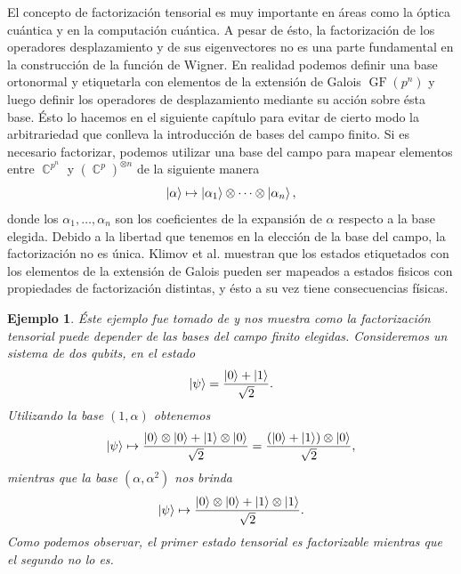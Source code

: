 \documentclass[a4paper,11pt]{report}
\DeclareMathOperator{\C}{\mathbb{C}}
\DeclareMathOperator{\GF}{GF}
\newtheorem{example}{Ejemplo}
\begin{document}
  El concepto de factorización tensorial es muy importante
  en áreas como la óptica cuántica y en la computación
  cuántica. A pesar de ésto, la factorización de los
  operadores desplazamiento y de sus eigenvectores no es una
  parte fundamental en la construcción de la función de
  Wigner. En realidad podemos definir una base ortonormal y
  etiquetarla con elementos de la extensión de Galois
  $\GF\left(p^{n}\right)$ y luego definir los operadores de
  desplazamiento mediante su acción sobre ésta base. Ésto lo
  hacemos en el siguiente capítulo para evitar de cierto
  modo la arbitrariedad que conlleva la introducción de
  bases del campo finito. Si es necesario factorizar,
  podemos utilizar una base del campo para mapear elementos
  entre $\C^{p^{n}}$ y $\left(\C^{p}\right)^{\otimes n}$ de
  la siguiente manera
  \[
    \ket \alpha
    \mapsto \ket{\alpha_1} \otimes \cdots \otimes
    \ket{\alpha_n},
  \] 
  donde los $\alpha_1,\ldots,\alpha_n$ son los coeficientes
  de la expansión de $\alpha$ respecto a la base elegida.
  Debido a la libertad que tenemos en la elección de la base
  del campo, la factorización no es única. Klimov et al.
  \cite{bjork2008} muestran que los estados etiquetados con
  los elementos de la extensión de Galois pueden ser
  mapeados a estados fisicos con propiedades de
  factorización distintas, y ésto a su vez tiene
  consecuencias físicas.
  \begin{example}
    Éste ejemplo fue tomado de \cite{bjork2008} y nos
    muestra como la factorización tensorial puede depender
    de las bases del campo finito elegidas. Consideremos un
    sistema de dos qubits, en el estado 
    \begin{equation}
      \ket \psi = \frac{\ket 0 + \ket{1}}{\sqrt{2}}.
    \end{equation}
    Utilizando la base $(1,\alpha)$ obtenemos 
    \begin{equation}
      \ket \psi \mapsto
      \frac{\ket 0 \otimes \ket 0 + \ket 1 \otimes \ket
      0}{\sqrt{2}}
      = \frac{\left( \ket 0 + \ket 1 \right) \otimes \ket
      0}{\sqrt{2}},
    \end{equation}
    mientras que la base $(\alpha,\alpha^2)$ nos brinda 
    \begin{equation}
      \ket \psi \mapsto
      \frac{\ket 0 \otimes \ket 0 + \ket 1 \otimes \ket
      1}{\sqrt{2}}.
    \end{equation}
    Como podemos observar, el primer estado tensorial es
    factorizable mientras que el segundo no lo es.
  \end{example}
\end{document}
